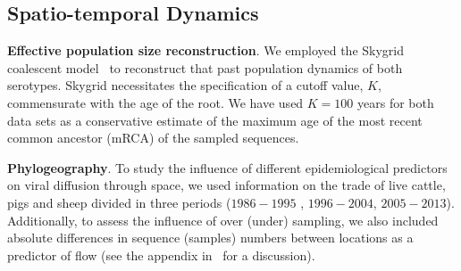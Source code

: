 \documentclass[10pt]{article}
\begin{document}
% 
% 

\subsection*{Spatio-temporal Dynamics}

\textbf{Effective population size reconstruction}.
We employed the Skygrid coalescent model~\citep{Gill2012} to reconstruct that past population dynamics of both serotypes.
Skygrid necessitates the specification of a cutoff value, $K$, commensurate with the age of the root.
We have used $K = 100$ years for both data sets as a conservative estimate of the maximum age of the most recent common ancestor (mRCA) of the sampled sequences. 

\textbf{Phylogeography}.
To study the influence of different epidemiological predictors on viral diffusion through space, we used information on the trade of live cattle, pigs and sheep divided in three periods ($1986-1995$ , $1996-2004$, $2005-2013$).
Additionally, to assess the influence of over (under) sampling, we also included absolute differences in sequence (samples) numbers between locations as a predictor of flow (see the appendix in~\cite{Lemey2014} for a discussion).
\end{document}
